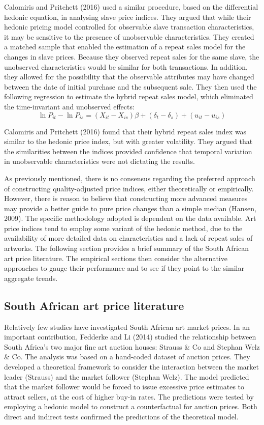 \documentclass[12pt,]{article}
\begin{document}
Calomiris and Pritchett (2016) used a similar procedure, based on the
differential hedonic equation, in analysing slave price indices. They
argued that while their hedonic pricing model controlled for observable
slave transaction characteristics, it may be sensitive to the presence
of unobservable characteristics. They created a matched sample that
enabled the estimation of a repeat sales model for the changes in slave
prices. Because they observed repeat sales for the same slave, the
unobserved characteristics would be similar for both transactions. In
addition, they allowed for the possibility that the observable
attributes may have changed between the date of initial purchase and the
subsequent sale. They then used the following regression to estimate the
hybrid repeat sales model, which eliminated the time-invariant and
unobserved effects:
\[\ln P_{it} - \ln P_{is} = (X_{it} - X_{is}) \beta + (\delta_t - \delta_s) + (u_{it} - u_{is})\]

Calomiris and Pritchett (2016) found that their hybrid repeat sales
index was similar to the hedonic price index, but with greater
volatility. They argued that the similarities between the indices
provided confidence that temporal variation in unobservable
characteristics were not dictating the results.

As previously mentioned, there is no consensus regarding the preferred
approach of constructing quality-adjusted price indices, either
theoretically or empirically. However, there is reason to believe that
constructing more advanced measures may provide a better guide to pure
price changes than a simple median (Hansen, 2009). The specific
methodology adopted is dependent on the data available. Art price
indices tend to employ some variant of the hedonic method, due to the
availability of more detailed data on characteristics and a lack of
repeat sales of artworks. The following section provides a brief summary
of the South African art price literature. The empirical sections then
consider the alternative approaches to gauge their performance and to
see if they point to the similar aggregate trends.

\subsection{South African art price
literature}\label{south-african-art-price-literature}

Relatively few studies have investigated South African art market
prices. In an important contribution, Fedderke and Li (2014) studied the
relationship between South Africa's two major fine art auction houses:
Strauss \& Co and Stephan Welz \& Co. The analysis was based on a
hand-coded dataset of auction prices. They developed a theoretical
framework to consider the interaction between the market leader
(Strauss) and the market follower (Stephan Welz). The model predicted
that the market follower would be forced to issue excessive price
estimates to attract sellers, at the cost of higher buy-in rates. The
predictions were tested by employing a hedonic model to construct a
counterfactual for auction prices. Both direct and indirect tests
confirmed the predictions of the theoretical model.
\end{document}
